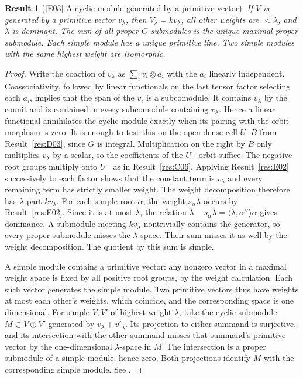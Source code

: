 \documentclass[11pt,a4paper,openany,oneside]{book}
\theoremstyle{resultstyle}
\newtheorem{statement}{Result}[chapter]
\newenvironment{result}[2]{\clubpenalty=10000\begin{statement}[\textnormal{[#1]} #2]\leavevmode\label{res:#1}\ignorespaces}{\end{statement}}
\theoremstyle{definition}
\numberwithin{equation}{chapter}
\begin{document}
\begin{result}{E03}{A cyclic module generated by a primitive vector}
If \(V\) is generated by a primitive vector \(v_\lambda\), then \(V_\lambda=kv_\lambda\), all other weights are \(<\lambda\), and \(\lambda\) is dominant. The sum of all proper \(G\)-submodules is the unique maximal proper submodule. Each simple module has a unique primitive line. Two simple modules with the same highest weight are isomorphic.
\end{result}
\begin{proof}
Write the coaction of \(v_\lambda\) as \(\sum_i v_i\otimes a_i\) with the \(a_i\) linearly independent. Coassociativity, followed by linear functionals on the last tensor factor selecting each \(a_i\), implies that the span of the \(v_i\) is a subcomodule. It contains \(v_\lambda\) by the counit and is contained in every subcomodule containing \(v_\lambda\). Hence a linear functional annihilates the cyclic module exactly when its pairing with the orbit morphism is zero. It is enough to test this on the open dense cell \(U^-B\) from Result~\ref{res:D03}, since \(G\) is integral. Multiplication on the right by \(B\) only multiplies \(v_\lambda\) by a scalar, so the coefficients of the \(U^-\)-orbit suffice. The negative root groups multiply onto \(U^-\) as in Result~\ref{res:C06}. Applying Result~\ref{res:E02} successively to each factor shows that the constant term is \(v_\lambda\) and every remaining term has strictly smaller weight. The weight decomposition therefore has \(\lambda\)-part \(kv_\lambda\). For each simple root \(\alpha\), the weight \(s_\alpha\lambda\) occurs by Result~\ref{res:E02}. Since it is at most \(\lambda\), the relation \(\lambda-s_\alpha\lambda=\langle\lambda,\alpha^\vee\rangle\alpha\) gives dominance. A submodule meeting \(kv_\lambda\) nontrivially contains the generator, so every proper submodule misses the \(\lambda\)-space. Their sum misses it as well by the weight decomposition. The quotient by this sum is simple.

A simple module contains a primitive vector: any nonzero vector in a maximal weight space is fixed by all positive root groups, by the weight calculation. Each such vector generates the simple module. Two primitive vectors thus have weights at most each other's weights, which coincide, and the corresponding space is one dimensional. For simple \(V,V'\) of highest weight \(\lambda\), take the cyclic submodule \(M\subset V\oplus V'\) generated by \(v_\lambda+v'_\lambda\). Its projection to either summand is surjective, and its intersection with the other summand misses that summand's primitive vector by the one-dimensional \(\lambda\)-space in \(M\). The intersection is a proper submodule of a simple module, hence zero. Both projections identify \(M\) with the corresponding simple module. See \cite[22.16--22.19]{milne}.
\end{proof}
\end{document}
